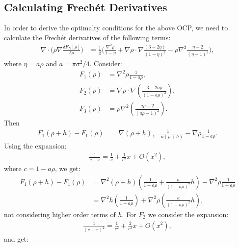 \documentclass[11pt, a4paper]{article}
\theoremstyle{definition}
\begin{document}
\subsection{Calculating Frech\'et Derivatives}
In order to derive the optimalty conditions for the above OCP, we need to calculate the Frech\'et derivatives of the following terms:
\begin{align*}
	\nabla \cdot \bigg(\rho \nabla \frac{\delta F_{N}[\rho]}{\delta \rho}\bigg)
	&= \frac{1}{\beta} \bigg( \frac{\nabla^2 \rho}{1 - \eta} +  \nabla \rho \cdot \nabla \frac{(3- 2 \eta)}{(1 - \eta)^2}  - \rho \nabla^2\frac{\eta - 2}{(\eta - 1)^2} \bigg),
\end{align*}
where $\eta = a \rho$ and $a = \pi \sigma^2 /4$.
Consider:
\begin{align*}
	F_1(\rho) &= \nabla^2 \rho \frac{1}{1- a\rho},\\
	F_2(\rho) &= \nabla \rho \cdot \nabla \left(\frac{3-2a\rho}{(1-a\rho)^2}\right),\\
	F_3(\rho) &= \rho \nabla^2 \left(\frac{a\rho -2}{(a\rho -1)^2}\right).
\end{align*}
Then
\begin{align*}
	F_1(\rho + h) - F_1(\rho) &= \nabla (\rho +h) \frac{1}{1- a(\rho +h)} - \nabla \rho \frac{1}{1- a\rho}.
\end{align*}
Using the expansion: 
\begin{align*}
	\frac{1}{c - x} = \frac{1}{c} + \frac{1}{c^2}x + O(x^2),
\end{align*}
where $c = 1- a \rho$, we get:
\begin{align*}
	F_1(\rho + h) - F_1(\rho) &= \nabla^2 (\rho +h) \left(\frac{1}{1- a\rho} + \frac{a}{(1- a\rho)^2}h \right)- \nabla^2 \rho \frac{1}{1- a\rho}\\
	&= \nabla^2 h \left(\frac{1}{1- a\rho} \right) + \nabla^2 \rho \left(\frac{a}{(1- a\rho)^2}h\right),
\end{align*}
not considering higher order terms of $h$.
For $F_2$ we consider the expansion:
\begin{align*}
	\frac{1}{(c-x)^2} = \frac{1}{c^2} + \frac{2}{c^3}x + O(x^2),
\end{align*}
and get:
\end{document}
